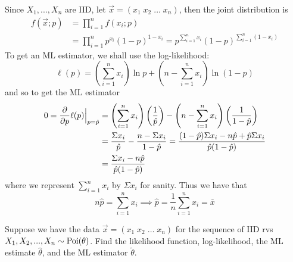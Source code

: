 \documentclass[notoc,notitlepage]{tufte-book}
\begin{document}
\begin{solution}
  Since $X_1, ..., X_n$ are IID, let $\vec{x} = ( x_1 \; x_2 \; \hdots \; x_n )$, then the joint distribution is
  \begin{align*}
    f(\vec{x}; p) &= \prod_{i=1}^{n} f(x_i; p) \\
                  &= \prod_{i=1}^{n} p^{x_i} ( 1 - p )^{1 - x_i} = p^{ \sum\limits_{i=1}^{n} x_i }(1 - p)^{\sum\limits_{i=1}^{n} (1 - x_i)}
  \end{align*}
  To get an ML estimator, we shall use the log-likelihood:
  \begin{equation*}
    \ell(p) = \left( \sum_{i=1}^{n} x_i \right) \ln p + \left( n - \sum_{i=1}^{n} x_i \right) \ln (1 - p)
  \end{equation*}
  and so to get the ML estimator
  \begin{align*}
    0 = \frac{\partial}{\partial p} \ell(p) \Big|_{p = \hat{p}}^{} &= \left( \sum_{i=1}^{n} x_i \right) \left( \frac{1}{\hat{ p }} \right) - \left( n - \sum_{i=1}^{n} x_i \right) \left( \frac{1}{1 - \hat{ p }} \right) \\
                                                               &= \frac{\Sigma x_i}{\hat{p}} - \frac{n - \Sigma x_i}{1 - \hat{p}} = \frac{(1 - \hat{p}) \Sigma x_i - n\hat{p} + \hat{p} \Sigma x_i}{\hat{p} (1 - \hat{p})} \\
                                                               &= \frac{\Sigma x_i - n\hat{p}}{\hat{p}(1 - \hat{p})}
  \end{align*}
  where we represent $\sum_{i=1}^{n} x_i$ by $\Sigma x_i$ for sanity. Thus we have that
  \begin{equation*}
    n \hat{p} = \sum_{i=1}^{n} x_i \implies \hat{p} = \frac{1}{n} \sum_{i=1}^{n} x_i = \bar{x}
  \end{equation*}
\end{solution}

\begin{eg}\label{eg:6_3}
  Suppose we have the data $\vec{x} = ( x_1 \; x_2 \; \hdots \; x_n )$ for the sequence of IID rvs $X_1, X_2, ..., X_n \sim \operatorname{Poi}(\theta)$. Find the likelihood function, log-likelihood, the ML estimate $\hat{\theta}$, and the ML estimator $\tilde{\theta}$.
\end{eg}
\end{document}
